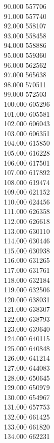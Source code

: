 { 90.000	557706 \\
 91.000	557740 \\
 92.000	558107 \\
 93.000	558458 \\
 94.000	558886 \\
 95.000	559360 \\
 96.000	562562 \\
 97.000	565638 \\
 98.000	570511 \\
 99.000	572503 \\
 100.000	605296 \\
 101.000	605581 \\
 102.000	606043 \\
 103.000	606351 \\
 104.000	615850 \\
 105.000	616228 \\
 106.000	617501 \\
 107.000	617892 \\
 108.000	619474 \\
 109.000	621152 \\
 110.000	624456 \\
 111.000	626358 \\
 112.000	626618 \\
 113.000	630110 \\
 114.000	630446 \\
 115.000	630938 \\
 116.000	631265 \\
 117.000	631761 \\
 118.000	632184 \\
 119.000	632506 \\
 120.000	638031 \\
 121.000	638307 \\
 122.000	638793 \\
 123.000	639640 \\
 124.000	640115 \\
 125.000	640848 \\
 126.000	641214 \\
 127.000	644083 \\
 128.000	650645 \\
 129.000	650979 \\
 130.000	654967 \\
 131.000	657753 \\
 132.000	661425 \\
 133.000	661820 \\
 134.000	662231 \\
}
